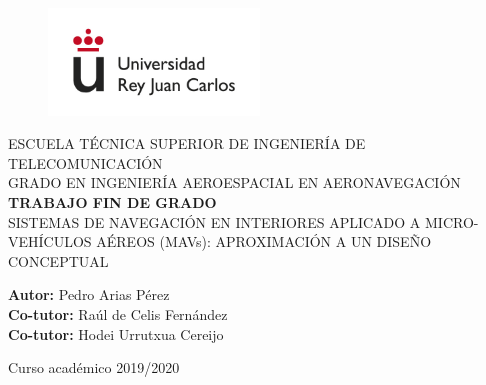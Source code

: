 \begin{figure}[t]
    \centering\includegraphics[width=0.5\textwidth]{photos/urjc_logo_letters.jpg}
\end{figure}

\begin{center}
    \textsc{ \Large{ESCUELA TÉCNICA SUPERIOR DE INGENIERÍA DE TELECOMUNICACIÓN \\}}
    \vspace{10mm}
	\textnormal{ \Large{GRADO EN INGENIERÍA AEROESPACIAL EN AERONAVEGACIÓN\\}}
	\vspace{25mm}
    \textup{\LARGE{\textbf{TRABAJO FIN DE GRADO}}} \\
    
    \vspace{25mm}
    \textnormal{ \Large{SISTEMAS DE NAVEGACIÓN EN INTERIORES APLICADO A MICRO-VEHÍCULOS AÉREOS (MAVs): APROXIMACIÓN A UN DISEÑO CONCEPTUAL}}
\end{center}

\vspace{30mm}

\begin{center}
    \textnormal{\normalsize{\textbf{Autor:} Pedro Arias Pérez \\}}
    \textnormal{\normalsize{\textbf{Co-tutor:} Raúl de Celis Fernández \\}}
    \textnormal{\normalsize{\textbf{Co-tutor:} Hodei Urrutxua Cereijo \\}}

\end{center}

\vspace{20mm}

\begin{center}
   \normalsize{Curso académico 2019/2020} 
\end{center}
